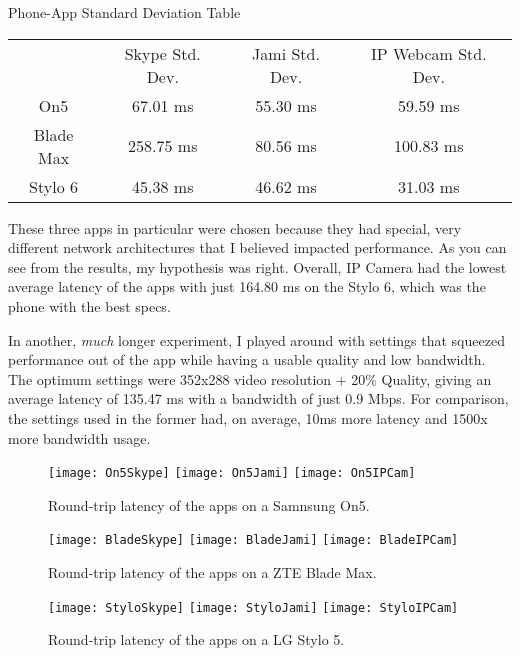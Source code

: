 \begin{centering}
Phone-App Standard Deviation Table\\[0.5cm]

\begin{tabular}{c|c|c|c}
    & Skype Std. Dev. & Jami Std. Dev. & IP Webcam Std. Dev. \\[0.5cm]
    On5 & 67.01 ms & 55.30 ms & 59.59 ms \\[0.5cm]
    Blade Max & 258.75 ms & 80.56 ms & 100.83 ms \\[0.5cm]
    Stylo 6 & 45.38 ms & 46.62 ms & 31.03 ms
\end{tabular} \newline

\end{centering}

These three apps in particular were chosen because they had special, very different network architectures that I believed impacted performance. As you can see from the results, my hypothesis was right. Overall, IP Camera had the lowest average latency of the apps with just 164.80 ms on the Stylo 6, which was the phone with the best specs.

In another, \textit{much} longer experiment, I played around with settings that squeezed performance out of the app while having a usable quality and low bandwidth. The optimum settings were 352x288 video resolution + 20\% Quality, giving an average latency of 135.47 ms with a bandwidth of just 0.9 Mbps. For comparison, the settings used in the former had, on average, 10ms more latency and 1500x more bandwidth usage.


\begin{figure}[h]
    \centering
    \texttt{[image: On5Skype]}
    \texttt{[image: On5Jami]}
    \texttt{[image: On5IPCam]}
    \caption{
        Round-trip latency of the apps on a Samnsung On5.
    }
\end{figure}

\begin{figure}[h]
    \centering
    \texttt{[image: BladeSkype]}
    \texttt{[image: BladeJami]}
    \texttt{[image: BladeIPCam]}
    \caption{
        Round-trip latency of the apps on a ZTE Blade Max.
    }
\end{figure}

\begin{figure}[h]
    \centering
    \texttt{[image: StyloSkype]}
    \texttt{[image: StyloJami]}
    \texttt{[image: StyloIPCam]}
    \caption{
        Round-trip latency of the apps on a LG Stylo 5.
    }
\end{figure}
